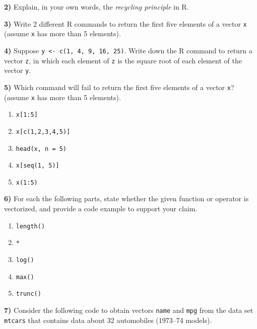 \documentclass[
]{book}
\newenvironment{Shaded}{\begin{snugshade}}{\end{snugshade}}
\newcommand{\CommentTok}[1]{\textcolor[rgb]{0.56,0.35,0.01}{\textit{#1}}}
\newcommand{\FunctionTok}[1]{\textcolor[rgb]{0.00,0.00,0.00}{#1}}
\newcommand{\NormalTok}[1]{#1}
\newcommand{\OtherTok}[1]{\textcolor[rgb]{0.56,0.35,0.01}{#1}}
\newcommand{\SpecialCharTok}[1]{\textcolor[rgb]{0.00,0.00,0.00}{#1}}
\begin{document}
\textbf{2)} Explain, in your own words, the \emph{recycling principle} in R.

\textbf{3)} Write 2 different R commands to return the first five elements of a
vector \texttt{x} (assume \texttt{x} has more than 5 elements).

\textbf{4)} Suppose \texttt{y\ \textless{}-\ c(1,\ 4,\ 9,\ 16,\ 25)}. Write down the R command to return a
vector \texttt{z}, in which each element of \texttt{z} is the square root of each element of
the vector \texttt{y}.

\textbf{5)} Which command will fail to return the first five elements of a vector
\texttt{x}? (assume \texttt{x} has more than 5 elements).

\begin{enumerate}
\def\labelenumi{\alph{enumi})}
\item
  \texttt{x{[}1:5{]}}
\item
  \texttt{x{[}c(1,2,3,4,5){]}}
\item
  \texttt{head(x,\ n\ =\ 5)}
\item
  \texttt{x{[}seq(1,\ 5){]}}
\item
  \texttt{x(1:5)}
\end{enumerate}

\textbf{6)} For each the following parts, state whether the given function or
operator is vectorized, and provide a code example to support your claim.

\begin{enumerate}
\def\labelenumi{\alph{enumi})}
\item
  \texttt{length()}
\item
  \texttt{*}
\item
  \texttt{log()}
\item
  \texttt{max()}
\item
  \texttt{trunc()}
\end{enumerate}

\textbf{7)} Consider the following code to obtain vectors \texttt{name} and \texttt{mpg} from the
data set \texttt{mtcars} that contains data about 32 automobiles (1973--74 models).

\begin{Shaded}
\end{Shaded}
\end{document}
